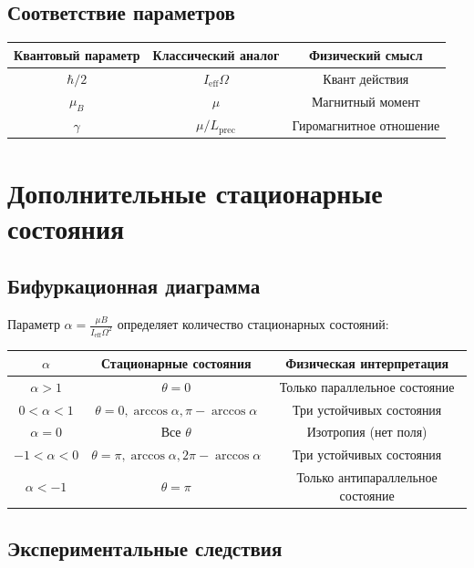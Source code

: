 \documentclass[12pt]{article}
\begin{document}
\subsection{Соответствие параметров}

\begin{center}
\begin{tabular}{|c|c|c|}
\hline
\textbf{Квантовый параметр} & \textbf{Классический аналог} & \textbf{Физический смысл} \\
\hline
$\hbar/2$ & $I_{\text{eff}} \Omega$ & Квант действия \\
$\mu_B$ & $\mu$ & Магнитный момент \\
$\gamma$ & $\mu/L_{\text{prec}}$ & Гиромагнитное отношение \\
\hline
\end{tabular}
\end{center}

\section{Дополнительные стационарные состояния}

\subsection{Бифуркационная диаграмма}

Параметр $\alpha = \frac{\mu B}{I_{\text{eff}} \Omega^2}$ определяет количество стационарных состояний:

\begin{center}
\begin{tabular}{|c|c|c|}
\hline
$\alpha$ & \textbf{Стационарные состояния} & \textbf{Физическая интерпретация} \\
\hline
$\alpha > 1$ & $\theta = 0$ & Только параллельное состояние \\
$0 < \alpha < 1$ & $\theta = 0, \arccos\alpha, \pi - \arccos\alpha$ & Три устойчивых состояния \\
$\alpha = 0$ & Все $\theta$ & Изотропия (нет поля) \\
$-1 < \alpha < 0$ & $\theta = \pi, \arccos\alpha, 2\pi - \arccos\alpha$ & Три устойчивых состояния \\
$\alpha < -1$ & $\theta = \pi$ & Только антипараллельное состояние \\
\hline
\end{tabular}
\end{center}

\subsection{Экспериментальные следствия}
\end{document}
